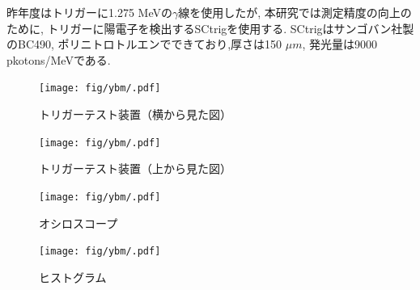 昨年度はトリガーに1.275 MeVの$\gamma$線を使用したが,
本研究では測定精度の向上のために,
トリガーに陽電子を検出するSCtrigを使用する.
SCtrigはサンゴバン社製のBC490,
ポリニトロトルエンでできており,厚さは150 $\si{\mu m}$,
発光量は9000 pkotons/MeVである.

\begin{figure}[H]
\centering
\texttt{[image: fig/ybm/.pdf]}
\caption{トリガーテスト装置（横から見た図）}
\label{fig:}
\end{figure}

\begin{figure}[H]
\centering
\texttt{[image: fig/ybm/.pdf]}
\caption{トリガーテスト装置（上から見た図）}
\label{fig:}
\end{figure}

\begin{figure}[H]
\centering
\texttt{[image: fig/ybm/.pdf]}
\caption{オシロスコープ}
\label{fig:}
\end{figure}

\begin{figure}[H]
\centering
\texttt{[image: fig/ybm/.pdf]}
\caption{ヒストグラム}
\label{fig:}
\end{figure}




